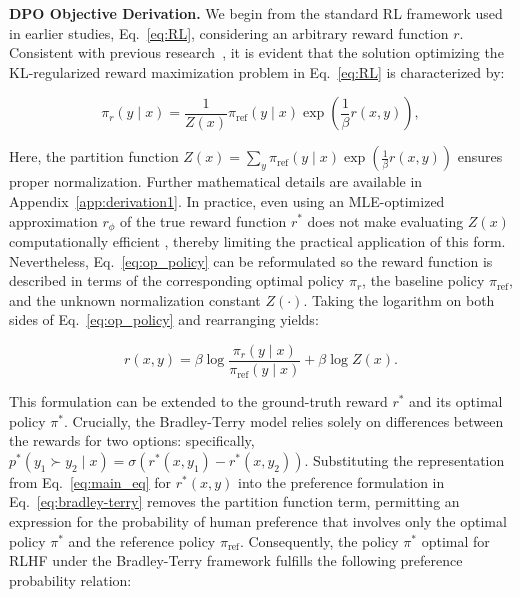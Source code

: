 \textbf{DPO Objective Derivation.} We begin from the standard RL framework used in earlier studies, Eq.~\ref{eq:RL}, considering an arbitrary reward function $r$. Consistent with previous research~\citep{peters2007reinforcement, peng2019advantage, korbak2022reinforcement, go2023aligning}, it is evident that the solution optimizing the KL-regularized reward maximization problem in Eq.~\ref{eq:RL} is characterized by:

\begin{equation}\label{eq:op_policy}
    \pi_r(y\mid x) = \frac{1}{Z(x)}\pi_\text{ref}(y\mid x)\exp\left(\frac{1}{\beta}r(x, y)\right),
\end{equation}

Here, the partition function $Z(x) =\sum_{y}\pi_\text{ref}(y\mid x)\exp\left(\frac{1}{\beta}r(x, y)\right)$ ensures proper normalization. Further mathematical details are available in Appendix~\ref{app:derivation1}. In practice, even using an MLE-optimized approximation $r_\phi$ of the true reward function $r^*$ does not make evaluating $Z(x)$ computationally efficient \citep{korbak2022reinforcement, go2023aligning}, thereby limiting the practical application of this form. Nevertheless, Eq.~\ref{eq:op_policy} can be reformulated so the reward function is described in terms of the corresponding optimal policy $\pi_r$, the baseline policy $\pi_\text{ref}$, and the unknown normalization constant $Z(\cdot)$. Taking the logarithm on both sides of Eq.~\ref{eq:op_policy} and rearranging yields:

\begin{equation}\label{eq:main_eq}
    r(x,y) =\beta \log \frac{\pi_r(y\mid x)}{\pi_\text{ref}(y\mid x)} + \beta \log Z(x).
\end{equation}

This formulation can be extended to the ground-truth reward $r^*$ and its optimal policy $\pi^*$. Crucially, the Bradley-Terry model relies solely on differences between the rewards for two options: specifically, ${p^*(y_1 \succ y_2 \mid x) = \sigma(r^*(x, y_1) - r^*(x, y_2))}$. Substituting the representation from Eq.~\ref{eq:main_eq} for $r^*(x,y)$ into the preference formulation in Eq.~\ref{eq:bradley-terry} removes the partition function term, permitting an expression for the probability of human preference that involves only the optimal policy $\pi^*$ and the reference policy $\pi_\text{ref}$. Consequently, the policy $\pi^*$ optimal for RLHF under the Bradley-Terry framework fulfills the following preference probability relation:

